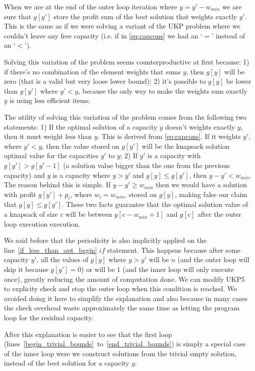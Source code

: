 \documentclass[12pt]{article}
\begin{document}
When we are at the end of the outer loop iteration where \(y = y' - w_{min}\) we are sure that \(g[y']\) store the profit sum of the best solution that weights exactly \(y'\). This is the same as if we were solving a variant of the UKP problem where we couldn't leave any free capacity (i.e. if in \eqref{eq:capcons} we had an `\(=\)' instead of an `\(<\)').

Solving this variation of the problem seems counterproductive at first because: 1) if there's no combination of the element weights that sums \(y\), then \(g[y]\) will be zero (that is a valid but very loose lower bound); 2) it's possible to \(g[y]\) be lower than \(g[y']\) where \(y' < y\), because the only way to make the weights sum exactly \(y\) is using less efficient items.

The utility of solving this variation of the problem comes from the following two statements: 1) If the optimal solution of a capacity \(y\) doesn't weights exactly \(y\), then it must weight less than \(y\). This is derived from \eqref{eq:capcons}. If it weights \(y'\), where \(y' < y\), then the value stored on \(g[y']\) will be the knapsack solution optimal value for the capacities \(y'\) to \(y\); 2) If \(y'\) is a capacity with \(g[y'] > g[y'-1]\) (a solution value bigger than the one from the previous capacity) and \(y\) is a capacity where \(y > y'\) and \(g[y] \leq g[y']\), then \(y - y' < w_{min}\). The reason behind this is simple. If \(y - y' \geq w_{min}\) then we would have a solution with profit \(g[y'] + p_i\), where \(w_i = w_{min}\), stored on \(g[y]\), making false our claim that \(g[y] \leq g[y']\). These two facts guarantee that the optimal solution value of a knapsack of size \(c\) will be between \(g[c-w_{min}+1]\) and \(g[c]\) after the outer loop execution execution.

We said before that the periodicity is also implicitly applied on the line~\ref{if_less_than_opt_begin} \(if\) statement. This happens because after some capacity \(y'\), all the values of \(g[y]\) where \(y > y'\) will be \(n\) (and the outer loop will skip it because \(g[y'] = 0\)) or will be \(1\) (and the inner loop will only execute once), greatly reducing the amount of computation done. We can modify UKP5 to explicity check and stop the outer loop when this condition is reached. We avoided doing it here to simplify the explanation and also because in many cases the check overhead waste approximately the same time as letting the program loop for the residual capacity.

After this explanation is easier to see that the first loop (lines~\ref{begin_trivial_bounds}~to~\ref{end_trivial_bounds}) is simply a special case of the inner loop were we construct solutions from the trivial empty solution, instead of the best solution for a capacity \(y\).
\end{document}
